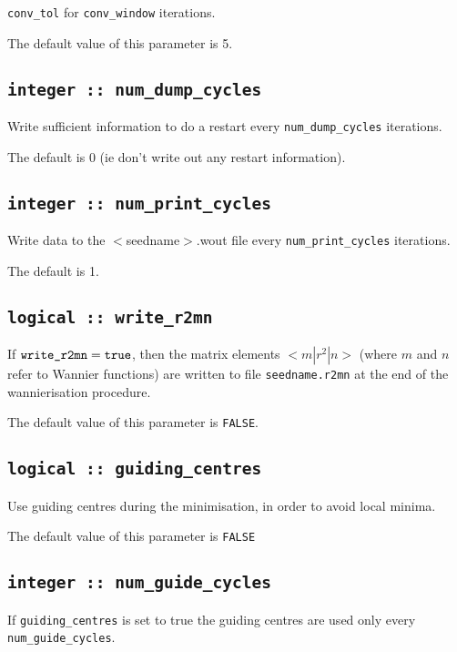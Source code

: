 \verb#conv_tol# for \verb#conv_window# iterations.

The default value of this parameter is 5.


\subsection[num\_dump\_cycles]{\tt integer :: num\_dump\_cycles}
Write sufficient information to do a restart every
\verb#num_dump_cycles# iterations.

The default is 0 (ie don't write out any restart information).

\subsection[num\_print\_cycles]{\tt integer :: num\_print\_cycles}
Write data to the $<$seedname$>$.wout file every
\verb#num_print_cycles# iterations.
                                                                                                                              
The default is 1.
                                                                                                                              
\subsection[write\_r2mn]{\tt logical :: write\_r2mn}

If $\verb#write_r2mn#=\verb#true#$, then the matrix elements
$<m|r^2|n>$ (where $m$ and $n$ refer to Wannier functions) are written
to file \verb#seedname.r2mn# at the end of the wannierisation procedure.

The default value of this parameter is \verb#FALSE#.


\subsection[guiding\_centres]{\tt logical :: guiding\_centres}
Use guiding centres during the minimisation, in order to avoid
local minima.

The default value of this parameter is \verb#FALSE#

\subsection[num\_guide\_cycles]{\tt integer :: num\_guide\_cycles}
If \verb#guiding_centres# is set to true the
guiding centres are used only every \verb#num_guide_cycles#.

